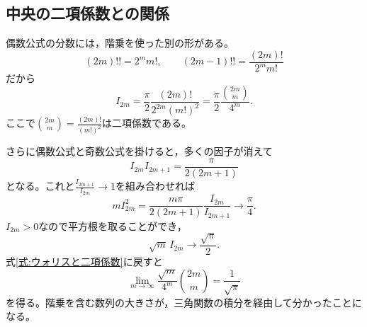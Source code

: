\subsection{中央の二項係数との関係}

偶数公式の分数には，階乗を使った別の形がある。
\[
 (2m)!!=2^m m!,\qquad
 (2m-1)!!=\frac{(2m)!}{2^m m!}
\]
だから
\begin{equation}\label{式:ウォリスと二項係数}
 I_{2m}=\frac{\pi}{2}\frac{(2m)!}{2^{2m}(m!)^2}
 =\frac{\pi}{2}\frac{\binom{2m}{m}}{4^m}.
\end{equation}
ここで$\binom{2m}{m}=\frac{(2m)!}{(m!)^2}$は二項係数である。

さらに偶数公式と奇数公式を掛けると，多くの因子が消えて
\[
 I_{2m}I_{2m+1}=\frac{\pi}{2(2m+1)}
\]
となる。これと$\frac{I_{2m+1}}{I_{2m}}\to1$を組み合わせれば
\[
 mI_{2m}^2
 =\frac{m\pi}{2(2m+1)}\frac{I_{2m}}{I_{2m+1}}
 \longrightarrow\frac{\pi}{4}.
\]
$I_{2m}>0$なので平方根を取ることができ，
\[
 \sqrt m\,I_{2m}\longrightarrow\frac{\sqrt\pi}{2}.
\]
式\eqref{式:ウォリスと二項係数}に戻すと
\begin{equation}\label{式:中央二項係数の極限}
 \lim_{m\to\infty}\frac{\sqrt m}{4^m}\binom{2m}{m}
 =\frac1{\sqrt\pi}
\end{equation}
を得る。階乗を含む数列の大きさが，三角関数の積分を経由して分かったことになる。

